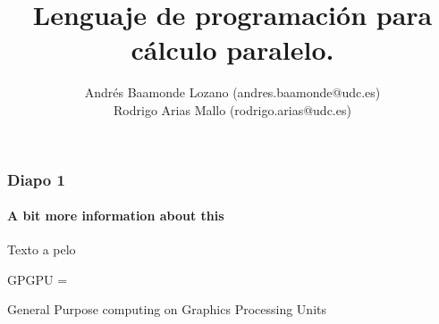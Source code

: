 \documentclass{beamer}
\title{Lenguaje de programación para cálculo paralelo.}
\author{Andrés Baamonde Lozano (andres.baamonde@udc.es)\\
	Rodrigo Arias Mallo (rodrigo.arias@udc.es)}
\begin{document}




\begin{frame}
\frametitle{Diapo 1}
\framesubtitle{A bit more information about this}
Texto a pelo

\end{frame}

\begin{frame}

GPGPU =

General	Purpose computing on Graphics Processing Units

\end{frame}
\end{document}
